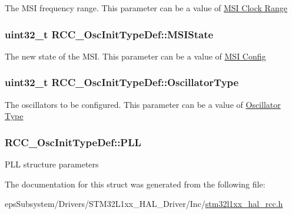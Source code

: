 The M\-S\-I frequency range. This parameter can be a value of \hyperlink{group___r_c_c___m_s_i___clock___range}{M\-S\-I Clock Range} \hypertarget{struct_r_c_c___osc_init_type_def_ae195d3c855a814b931f7cf57e4fc3fe6}{
\subsubsection[{M\-S\-I\-State}]{\setlength{\rightskip}{0pt plus 5cm}uint32\-\_\-t R\-C\-C\-\_\-\-Osc\-Init\-Type\-Def\-::\-M\-S\-I\-State}}\label{struct_r_c_c___osc_init_type_def_ae195d3c855a814b931f7cf57e4fc3fe6}
The new state of the M\-S\-I. This parameter can be a value of \hyperlink{group___r_c_c___m_s_i___config}{M\-S\-I Config} \hypertarget{struct_r_c_c___osc_init_type_def_af9e7bc89cab81c1705d94c74c7a81088}{
\subsubsection[{Oscillator\-Type}]{\setlength{\rightskip}{0pt plus 5cm}uint32\-\_\-t R\-C\-C\-\_\-\-Osc\-Init\-Type\-Def\-::\-Oscillator\-Type}}\label{struct_r_c_c___osc_init_type_def_af9e7bc89cab81c1705d94c74c7a81088}
The oscillators to be configured. This parameter can be a value of \hyperlink{group___r_c_c___oscillator___type}{Oscillator Type} \hypertarget{struct_r_c_c___osc_init_type_def_af76de5ee86798f0c3a4c83c84dfa58be}{
\subsubsection[{P\-L\-L}]{ R\-C\-C\-\_\-\-Osc\-Init\-Type\-Def\-::\-P\-L\-L}}\label{struct_r_c_c___osc_init_type_def_af76de5ee86798f0c3a4c83c84dfa58be}
P\-L\-L structure parameters 

The documentation for this struct was generated from the following file\-:\begin{DoxyCompactItemize}
\item 
eps\-Subsystem/\-Drivers/\-S\-T\-M32\-L1xx\-\_\-\-H\-A\-L\-\_\-\-Driver/\-Inc/\hyperlink{stm32l1xx__hal__rcc_8h}{stm32l1xx\-\_\-hal\-\_\-rcc.\-h}\end{DoxyCompactItemize}
